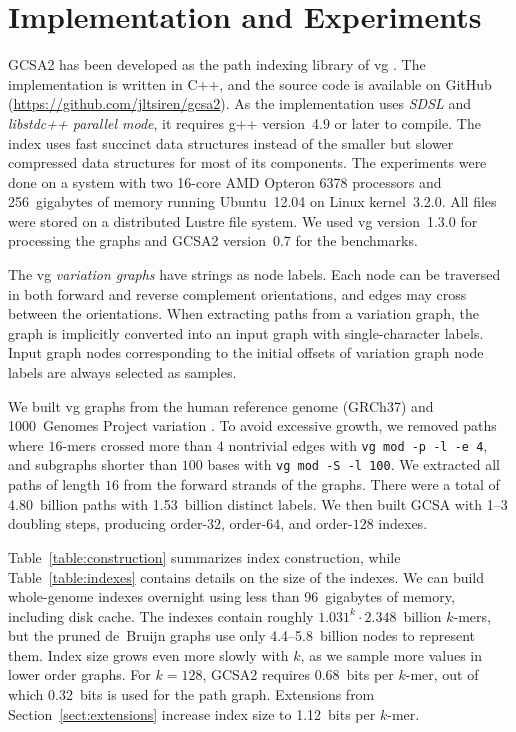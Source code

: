 \documentclass[a4paper,11pt]{llncs}
\newcommand{\kmer}[1]{$#1$\nobreakdash-mer}
\newcommand{\orderk}[1]{order\nobreakdash-$#1$}
\begin{document}
\section{Implementation and Experiments}

GCSA2 has been developed as the path indexing library of vg \cite{Garrison2014-2016}. The implementation is written in C++, and the source code is available on GitHub (\url{https://github.com/jltsiren/gcsa2}). As the implementation uses \emph{SDSL} \cite{Gog2014b} and \emph{libstdc++ parallel mode}, it requires g++ version~4.9 or later to compile. The index uses fast succinct data structures instead of the smaller but slower compressed data structures for most of its components. The experiments were done on a system with two 16\nobreakdash-core AMD Opteron 6378 processors and 256~gigabytes of memory running Ubuntu~12.04 on Linux kernel~3.2.0. All files were stored on a distributed Lustre file system. We used vg version~1.3.0 for processing the graphs and GCSA2 version~0.7 for the benchmarks.

The vg \emph{variation graphs} have strings as node labels. Each node can be traversed in both forward and reverse complement orientations, and edges may cross between the orientations. When extracting paths from a variation graph, the graph is implicitly converted into an input graph with single-character labels. Input graph nodes corresponding to the initial offsets of variation graph node labels are always selected as samples.

We built vg graphs from the human reference genome (GRCh37) and 1000~Genomes Project variation \cite{1000GP2015}. To avoid excessive growth, we removed paths where \kmer{16}s crossed more than $4$ nontrivial edges with \texttt{vg mod -p -l -e 4}, and subgraphs shorter than $100$ bases with \texttt{vg mod -S -l 100}. We extracted all paths of length $16$ from the forward strands of the graphs. There were a total of 4.80~billion paths with 1.53~billion distinct labels. We then built GCSA with 1\nobreakdash--3 doubling steps, producing \orderk{32}, \orderk{64}, and \orderk{128} indexes.

Table~\ref{table:construction} summarizes index construction, while Table~\ref{table:indexes} contains details on the size of the indexes. We can build whole-genome indexes overnight using less than 96~gigabytes of memory, including disk cache. The indexes contain roughly $1.031^{k} \cdot 2.348$~billion \kmer{k}s, but the pruned de~Bruijn graphs use only 4.4\nobreakdash--5.8~billion nodes to represent them. Index size grows even more slowly with $k$, as we sample more values in lower order graphs. For $k = 128$, GCSA2 requires 0.68~bits per \kmer{k}, out of which 0.32~bits is used for the path graph. Extensions from Section~\ref{sect:extensions} increase index size to 1.12~bits per \kmer{k}.
\end{document}
